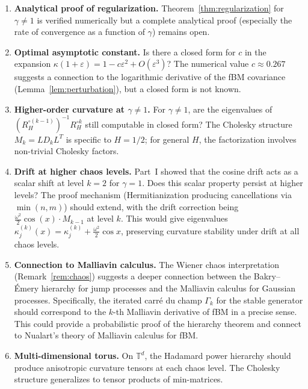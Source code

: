 \documentclass[11pt,a4paper]{article}
\theoremstyle{plain}
\theoremstyle{definition}
\theoremstyle{remark}
\newcommand{\T}{\mathbb{T}}
\begin{document}
\begin{enumerate}[label=(\roman*)]
\item \textbf{Analytical proof of regularization.}
  Theorem~\ref{thm:regularization} for $\gamma \neq 1$ is
  verified numerically but a complete analytical proof
  (especially the rate of convergence as a function of
  $\gamma$) remains open.

\item \textbf{Optimal asymptotic constant.}
  Is there a closed form for $c$ in the expansion
  $\kappa(1+\varepsilon) = 1 - c\varepsilon^2 + O(\varepsilon^3)$?
  The numerical value $c \approx 0.267$ suggests a connection
  to the logarithmic derivative of the fBM covariance
  (Lemma~\ref{lem:perturbation}), but a closed form is not known.

\item \textbf{Higher-order curvature at $\gamma \neq 1$.}
  For $\gamma \neq 1$, are the eigenvalues of
  $(R_H^{\circ(k-1)})^{-1} R_H^{\circ k}$ still computable
  in closed form? The Cholesky structure
  $M_k = L D_k L^T$ is specific to $H = 1/2$; for general $H$,
  the factorization involves non-trivial Cholesky factors.

\item \textbf{Drift at higher chaos levels.}
  Part~I showed that the cosine drift acts as a scalar shift
  at level $k = 2$ for $\gamma = 1$.
  Does this scalar property persist at higher levels?
  The proof mechanism (Hermitianization producing cancellations
  via $\min(n,m)$) should extend, with the drift correction
  being $\frac{\omega^2}{2}\cos(x) \cdot M_{k-1}$ at level $k$.
  This would give eigenvalues
  $\kappa_j^{(k)}(x) = \kappa_j^{(k)} + \frac{\omega^2}{2}\cos x$,
  preserving curvature stability under drift at all chaos levels.

\item \textbf{Connection to Malliavin calculus.}
  The Wiener chaos interpretation
  (Remark~\ref{rem:chaos}) suggests a deeper connection
  between the Bakry--\'Emery hierarchy for jump processes
  and the Malliavin calculus for Gaussian processes.
  Specifically, the iterated carr\'e du champ $\Gamma_k$
  for the stable generator should correspond to the $k$-th
  Malliavin derivative of fBM in a precise sense.
  This could provide a probabilistic proof of the hierarchy
  theorem and connect to Nualart's theory of Malliavin
  calculus for fBM.

\item \textbf{Multi-dimensional torus.}
  On $\T^d$, the Hadamard power hierarchy should produce
  anisotropic curvature tensors at each chaos level.
  The Cholesky structure generalizes to tensor products
  of min-matrices.
\end{enumerate}
\end{document}
